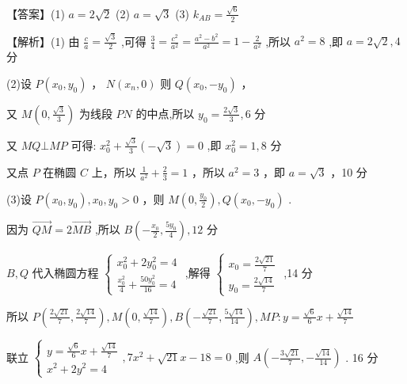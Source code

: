 \documentclass[10pt]{article}
\begin{document}
【答案】(1) \(a = 2\sqrt{2}\) (2) \(a = \sqrt{3}\) (3) \({k}_{AB} = \frac{\sqrt{6}}{2}\)

【解析】(1) 由 \(\frac{c}{a} = \frac{\sqrt{3}}{2}\) ,可得 \(\frac{3}{4} = \frac{{c}^{2}}{{a}^{2}} = \frac{{a}^{2} - {b}^{2}}{{a}^{2}} = 1 - \frac{2}{{a}^{2}}\) ,所以 \({a}^{2} = 8\) ,即 \(a = 2\sqrt{2},4\) 分

(2)设 \(P\left( {{x}_{0},{y}_{0}}\right)\) ， \(N\left( {{x}_{n},0}\right)\) 则 \(Q\left( {{x}_{0}, - {y}_{0}}\right)\) ，

又 \(M\left( {0,\frac{\sqrt{3}}{3}}\right)\) 为线段 \({PN}\) 的中点,所以 \({y}_{0} = \frac{2\sqrt{3}}{3},6\) 分

又 \({MQ} \bot  {MP}\) 可得: \({x}_{0}^{2} + \frac{\sqrt{3}}{3}\left( {-\sqrt{3}}\right)  = 0\) ,即 \({x}_{0}^{2} = 1,8\) 分

又点 \(P\) 在椭圆 \(C\) 上，所以 \(\frac{1}{{a}^{2}} + \frac{2}{3} = 1\) ，所以 \({a}^{2} = 3\) ，即 \(a = \sqrt{3}\) ，10 分

(3)设 \(P\left( {{x}_{0},{y}_{0}}\right) ,{x}_{0},{y}_{0} > 0\) ，则 \(M\left( {0,\frac{{y}_{0}}{2}}\right) ,Q\left( {{x}_{0}, - {y}_{0}}\right)\) .

因为 \(\overrightarrow{QM} = 2\overrightarrow{MB}\) ,所以 \(B\left( {-\frac{{x}_{0}}{2},\frac{5{y}_{0}}{4}}\right) ,{12}\) 分

\(B,Q\) 代入椭圆方程 \(\left\{  \begin{array}{l} {x}_{0}^{2} + 2{y}_{0}^{2} = 4 \\  \frac{{x}_{0}^{2}}{4} + \frac{{50}{y}_{0}^{2}}{16} = 4 \end{array}\right.\) ,解得 \(\left\{  \begin{array}{l} {x}_{0} = \frac{2\sqrt{21}}{7} \\  {y}_{0} = \frac{2\sqrt{14}}{7} \end{array}\right.\) ,14 分

所以 \(P\left( {\frac{2\sqrt{21}}{7},\frac{2\sqrt{14}}{7}}\right) ,M\left( {0,\frac{\sqrt{14}}{7}}\right) ,B\left( {-\frac{\sqrt{21}}{7},\frac{5\sqrt{14}}{14}}\right) ,{MP} : y = \frac{\sqrt{6}}{6}x + \frac{\sqrt{14}}{7}\)

联立 \(\left\{  \begin{matrix} y = \frac{\sqrt{6}}{6}x + \frac{\sqrt{14}}{7} \\  {x}^{2} + 2{y}^{2} = 4 \end{matrix}\right. ,7{x}^{2} + \sqrt{21}x - {18} = 0\) ,则 \(A\left( {-\frac{3\sqrt{21}}{7}, - \frac{\sqrt{14}}{14}}\right)\) . 16 分
\end{document}
